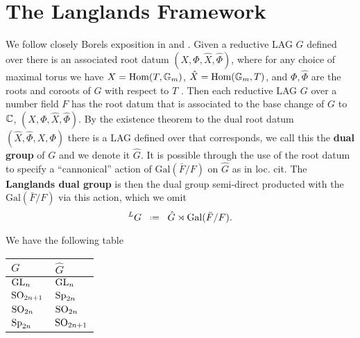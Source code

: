 \section{The Langlands Framework}
We follow closely Borels exposition in \cite[Part 2. III. 2. ]{borelAutomorphicFormsRepresentations1979} and \cite{shahidiEisensteinSeriesAutomorphic2010}.
Given a reductive LAG \(G\) defined over \C there is an associated root datum \((X, \Phi, \hat{X}, \hat{\Phi})\), where for any choice of maximal torus we have \(X = \operatorname{Hom}(T, \mathbb{G}_m)\), \(\hat{X} = \operatorname{Hom}(\mathbb{G}_m, T)\), and \(\Phi, \hat\Phi\) are the roots and coroots of \(G\) with respect to \(T\) \cite[7.4.3]{springerLinearAlgebraicGroups1998}.  Then each reductive LAG \(G\) over a number field \(F\) has the root datum that is associated to the base change of \(G\) to \(\C\), \((X, \Phi, \hat{X}, \hat{\Phi})\).
By the existence theorem \cite[10]{springerLinearAlgebraicGroups1998} to the dual root datum \(( \hat{X}, \hat{\Phi}, X, \Phi)\) there is a LAG defined over \C that corresponds, we call this the \textbf{dual group} of \(G\) and we denote it \(\hat{G}\). It is possible through the use of the root datum to specify a ``cannonical'' action of \(\mathrm{Gal}(\bar{F}/F)\) on \(\hat{G}\) as in loc. cit.
The \textbf{Langlands dual group} is then the dual group semi-direct producted with the \(\mathrm{Gal}(\bar{F}/F)\) via this action, which we omit
\[^L G \defeq \hat{G} \rtimes \mathrm{Gal}(\bar{F}/F).\]

\begin{example}
	We have the following table
	\begin{table}[h]
		\centering
		\begin{tabular}{ll}
			\(G\)         & \(\hat{G}\)   \\ \hline
			\(\operatorname{GL}_n\)     & \(\operatorname{GL}_n\)     \\
			\(\operatorname{SO}_{2n+1}\) & \(\operatorname{Sp}_{2n}\)  \\
			\(\operatorname{SO}_{2n}\)   & \(\operatorname{SO}_{2n}\)   \\
			\(\operatorname{Sp}_{2n}\)  & \(\operatorname{SO}_{2n+1}\)
		\end{tabular}
	\end{table}
\end{example}

